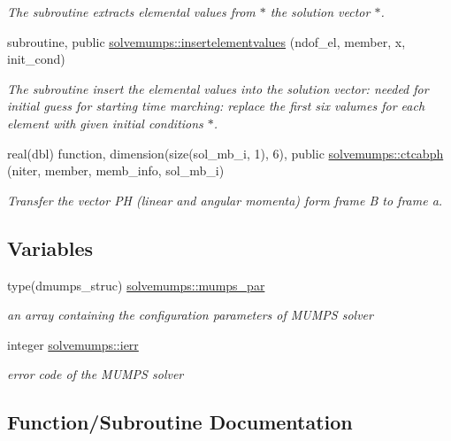 \begin{DoxyCompactItemize}
\begin{DoxyCompactList}\small\item\em The subroutine extracts elemental values from $\ast$ the solution vector $\ast$. \end{DoxyCompactList}\item 
subroutine, public \hyperlink{namespacesolvemumps_a3c8d285942de4048473a98c26d248fd7}{solvemumps\+::insertelementvalues} (ndof\+\_\+el, member, x, init\+\_\+cond)
\begin{DoxyCompactList}\small\item\em The subroutine insert the elemental values into the solution vector\+: needed for initial guess for starting time marching\+: replace the first six valumes for each element with given initial conditions $\ast$. \end{DoxyCompactList}\item 
real(dbl) function, dimension(size(sol\+\_\+mb\+\_\+i, 1), 6), public \hyperlink{namespacesolvemumps_a680703eba15a14e08417723cd80080b1}{solvemumps\+::ctcabph} (niter, member, memb\+\_\+info, sol\+\_\+mb\+\_\+i)
\begin{DoxyCompactList}\small\item\em Transfer the vector PH (linear and angular momenta) form frame B to frame a. \end{DoxyCompactList}\end{DoxyCompactItemize}
\subsection*{Variables}
\begin{DoxyCompactItemize}
\item 
type(dmumps\+\_\+struc) \hyperlink{namespacesolvemumps_ab76b5a7f705b0acb09ebc3ecf7e51f91}{solvemumps\+::mumps\+\_\+par}
\begin{DoxyCompactList}\small\item\em an array containing the configuration parameters of M\+U\+M\+PS solver \end{DoxyCompactList}\item 
integer \hyperlink{namespacesolvemumps_a5f812a31bb5931d66e5d6bb4c05f4a51}{solvemumps\+::ierr}
\begin{DoxyCompactList}\small\item\em error code of the M\+U\+M\+PS solver \end{DoxyCompactList}\end{DoxyCompactItemize}


\subsection{Function/\+Subroutine Documentation}
\mbox{\label{_solve_mumps_8f90_abd8e42559d02f73ced63544359b8b6a9}} 
